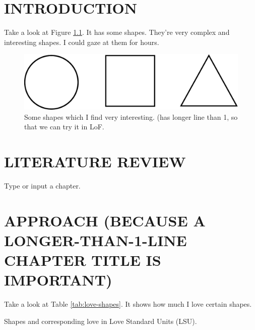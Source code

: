 \documentclass[dissertation]{uathesis_me}
\author{Joe Somebody}       %
\title{Title of the thesis: the top line should be the longest \and
  the middle one is second longest \and
  and the last is shortest}
\begin{document}
\makefrontmatter


\begin{body}

\chapter{INTRODUCTION}

Take a look at Figure \ref{fig:shapes}. It has some shapes. They're very
complex and interesting shapes. I could gaze at them for hours.

\begin{figure}%
\linespread{1}\selectfont %
  \centering
  \includegraphics[width=5.0in]{fig/shapes.pdf}
  \caption{Some shapes which I find very interesting. (has longer line than 1, so that we can try it in LoF.}
  \label{fig:shapes}
\end{figure}

\chapter{LITERATURE REVIEW}
Type or input{} a chapter. \cite{rocket-themoon2167}

\chapter{APPROACH (BECAUSE A LONGER-THAN-1-LINE CHAPTER TITLE IS IMPORTANT)}
Take a look at Table \ref{tab:love-shapes}. It shows how much I love certain
shapes.

\begin{table}%
\linespread{1}\selectfont %
  \centering
  
  \caption{Shapes and corresponding love in Love Standard Units (LSU).}
  \label{tab:love-shapes}
\end{table}


\end{body}
\end{document}
